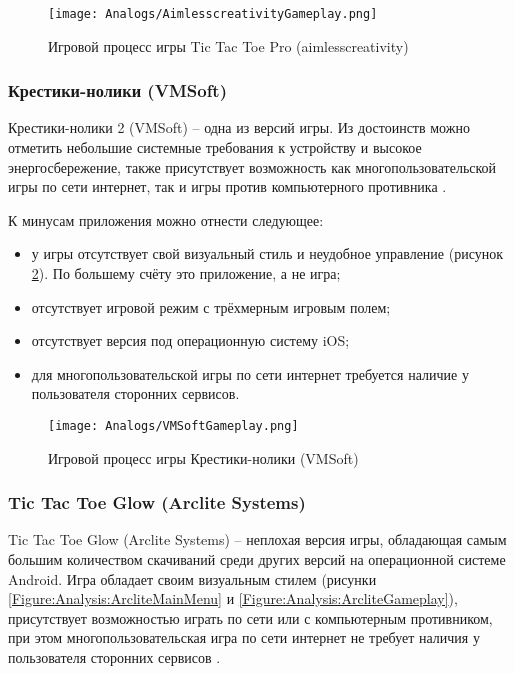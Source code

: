 \begin{figure}
\centering
    \texttt{[image: Analogs/AimlesscreativityGameplay.png]}
    \caption{Игровой процесс игры Tic Tac Toe Pro (aimlesscreativity)}
    \label{Figure:Analysis:AimlesscreativityGameplay}
\end{figure}


\subsubsection{Крестики-нолики (VMSoft)}

Крестики-нолики 2 (VMSoft) -- одна из версий игры. Из достоинств можно отметить небольшие системные требования к устройству и высокое энергосбережение, также присутствует возможность как многопользовательской игры по сети интернет, так и игры против компьютерного противника \cite{VMSoft}.

К минусам приложения можно отнести следующее:
\begin{itemize}
    \item у игры отсутствует свой визуальный стиль и неудобное управление (рисунок \ref{Figure:Analysis:VMSoftGameplay}). По большему счёту это приложение, а не игра;
    \item отсутствует игровой режим с трёхмерным игровым полем;
    \item отсутствует версия под операционную систему iOS;
    \item для многопользовательской игры по сети интернет требуется наличие у пользователя сторонних сервисов.
\end{itemize}

\begin{figure}
\centering
    \texttt{[image: Analogs/VMSoftGameplay.png]}
    \caption{Игровой процесс игры Крестики-нолики (VMSoft)}
    \label{Figure:Analysis:VMSoftGameplay}
\end{figure}


\subsubsection{Tic Tac Toe Glow (Arclite Systems)}

Tic Tac Toe Glow (Arclite Systems) -- неплохая версия игры, обладающая самым большим количеством скачиваний среди других версий на операционной системе Android. Игра обладает своим визуальным стилем (рисунки \ref{Figure:Analysis:ArcliteMainMenu} и \ref{Figure:Analysis:ArcliteGameplay}), присутствует возможностью играть по сети или с компьютерным противником, при этом многопользовательская игра по сети интернет не требует наличия у пользователя сторонних сервисов \cite{ArcliteSystems}.

